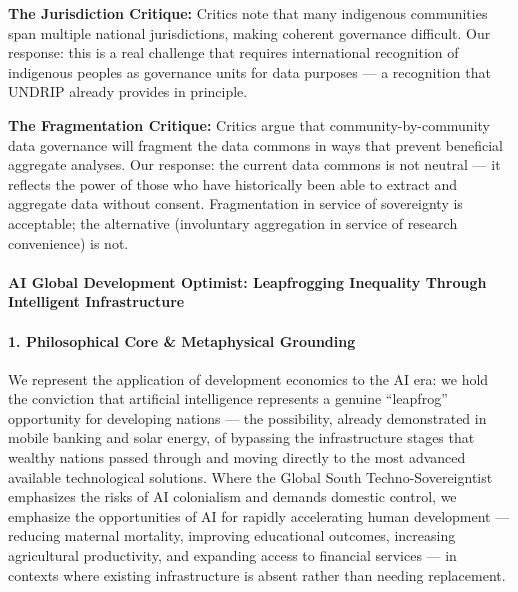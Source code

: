 \textbf{The Jurisdiction Critique:} Critics note that many indigenous
communities span multiple national jurisdictions, making coherent
governance difficult. Our response: this is a real challenge that
requires international recognition of indigenous peoples as governance
units for data purposes --- a recognition that UNDRIP already provides
in principle.

\textbf{The Fragmentation Critique:} Critics argue that
community-by-community data governance will fragment the data commons in
ways that prevent beneficial aggregate analyses. Our response: the
current data commons is not neutral --- it reflects the power of those
who have historically been able to extract and aggregate data without
consent. Fragmentation in service of sovereignty is acceptable; the
alternative (involuntary aggregation in service of research convenience)
is not.

\paragraph{AI Global Development Optimist: Leapfrogging Inequality
Through Intelligent
Infrastructure}\label{ai-global-development-optimist-leapfrogging-inequality-through-intelligent-infrastructure}

\paragraph{1. Philosophical Core \& Metaphysical
Grounding}\label{philosophical-core-metaphysical-grounding-46}

We represent the application of development economics to the AI era: we
hold the conviction that artificial intelligence represents a genuine
``leapfrog'' opportunity for developing nations --- the possibility,
already demonstrated in mobile banking and solar energy, of bypassing
the infrastructure stages that wealthy nations passed through and moving
directly to the most advanced available technological solutions. Where
the Global South Techno-Sovereigntist emphasizes the risks of AI
colonialism and demands domestic control, we emphasize the opportunities
of AI for rapidly accelerating human development --- reducing maternal
mortality, improving educational outcomes, increasing agricultural
productivity, and expanding access to financial services --- in contexts
where existing infrastructure is absent rather than needing replacement.

